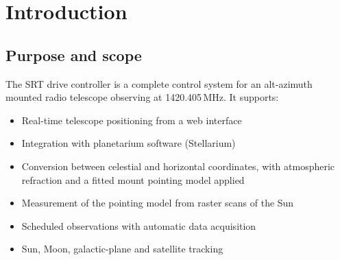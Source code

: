 \documentclass[11pt,a4paper]{article}
\begin{document}
\begin{abstract}
This document is the definitive technical description of the Small Radio Telescope (SRT) drive and control system used for 21\,cm hydrogen line observations at Acre Road Observatory, Glasgow. The system comprises an Arduino Due carrying out real-time motor control, a WT32-ETH01 (ESP32) controller performing astronomical coordinate transformation, pointing correction and network service, a GNU~Radio receiver, and a Flask observation scheduler that also runs the pointing calibration. The document covers the hardware, the firmware on both microcontrollers, the coordinate and pointing mathematics in full, the resident pointing model and the Sun-scan calibration that determines it, the private Ethernet link between the observatory computer and the controller, the receiver and scheduler, and the installation, operation and fault-finding procedures.
\end{abstract}

\tableofcontents
\newpage

\section{Introduction}

\subsection{Purpose and scope}

The SRT drive controller is a complete control system for an alt-azimuth mounted radio telescope observing at 1420.405\,MHz. It supports:

\begin{itemize}
    \item Real-time telescope positioning from a web interface
    \item Integration with planetarium software (Stellarium)
    \item Conversion between celestial and horizontal coordinates, with atmospheric refraction and a fitted mount pointing model applied
    \item Measurement of the pointing model from raster scans of the Sun
    \item Scheduled observations with automatic data acquisition
    \item Sun, Moon, galactic-plane and satellite tracking
\end{itemize}
\end{document}
